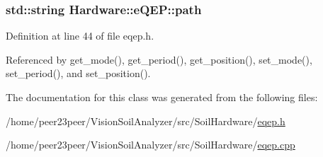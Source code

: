 \subsubsection[{path}]{\setlength{\rightskip}{0pt plus 5cm}std\+::string Hardware\+::e\+Q\+E\+P\+::path\hspace{0.3cm}{\ttfamily [private]}}\label{class_hardware_1_1e_q_e_p_a82718bc8478cde37f28fc685a859525e}


Definition at line 44 of file eqep.\+h.



Referenced by get\+\_\+mode(), get\+\_\+period(), get\+\_\+position(), set\+\_\+mode(), set\+\_\+period(), and set\+\_\+position().



The documentation for this class was generated from the following files\+:\begin{DoxyCompactItemize}
\item 
/home/peer23peer/\+Vision\+Soil\+Analyzer/src/\+Soil\+Hardware/\hyperlink{eqep_8h}{eqep.\+h}\item 
/home/peer23peer/\+Vision\+Soil\+Analyzer/src/\+Soil\+Hardware/\hyperlink{eqep_8cpp}{eqep.\+cpp}\end{DoxyCompactItemize}
